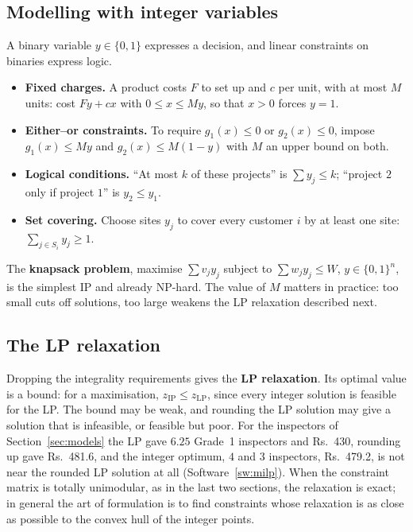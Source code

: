 \documentclass[11pt,a4paper]{article}
\numberwithin{equation}{section}
\theoremstyle{definition}
\begin{document}
\subsection{Modelling with integer variables}
\label{ssec:ipmodels}

A binary variable $y \in \{0, 1\}$ expresses a decision, and linear constraints on binaries express logic.
\begin{itemize}
\item \textbf{Fixed charges.} A product costs $F$ to set up and $c$ per unit, with at most $M$ units: cost $Fy + cx$ with $0 \leq x \leq My$, so that $x > 0$ forces $y = 1$.
\item \textbf{Either--or constraints.} To require $g_1(x) \leq 0$ or $g_2(x) \leq 0$, impose $g_1(x) \leq My$ and $g_2(x) \leq M(1 - y)$ with $M$ an upper bound on both.
\item \textbf{Logical conditions.} ``At most $k$ of these projects'' is $\sum y_j \leq k$; ``project $2$ only if project $1$'' is $y_2 \leq y_1$.
\item \textbf{Set covering.} Choose sites $y_j$ to cover every customer $i$ by at least one site: $\sum_{j \in S_i}y_j \geq 1$.
\end{itemize}
The \textbf{knapsack problem}, maximise $\sum v_jy_j$ subject to $\sum w_jy_j \leq W$, $y \in \{0, 1\}^n$, is the simplest IP and already NP-hard. The value of $M$ matters in practice: too small cuts off solutions, too large weakens the LP relaxation described next.

\subsection{The LP relaxation}
\label{ssec:relaxation}

Dropping the integrality requirements gives the \textbf{LP relaxation}. Its optimal value is a bound: for a maximisation, $z_{\mathrm{IP}} \leq z_{\mathrm{LP}}$, since every integer solution is feasible for the LP. The bound may be weak, and rounding the LP solution may give a solution that is infeasible, or feasible but poor. For the
inspectors of Section~\ref{sec:models} the LP gave $6.25$ Grade~1 inspectors and Rs.~430, rounding up gave Rs.~481.6, and the integer optimum, $4$ and $3$ inspectors, Rs.~479.2, is not near the rounded LP solution at all (Software~\ref{sw:milp}). When the constraint matrix is totally unimodular, as in the last two
sections, the relaxation is exact; in general the art of formulation is to find constraints whose relaxation is as close as possible to the convex hull of the integer points.
\end{document}
